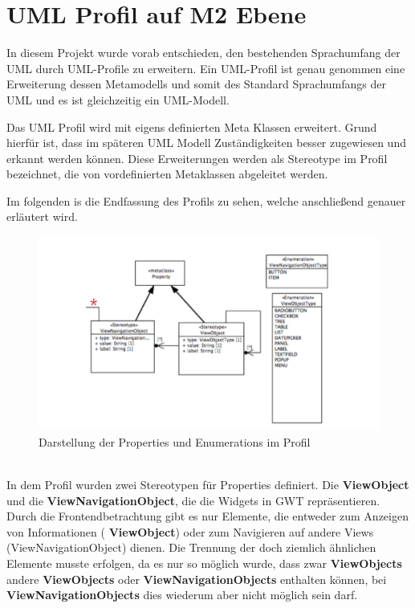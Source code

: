 \chapter{UML Profil auf M2 Ebene}
\label{UMLProfil}
In diesem Projekt wurde vorab entschieden, den bestehenden Sprachumfang der UML durch UML-Profile zu erweitern. Ein UML-Profil ist genau genommen eine Erweiterung dessen Metamodells und somit des Standard Sprachumfangs der UML und es ist gleichzeitig ein UML-Modell.

Das UML Profil wird mit eigens definierten Meta Klassen erweitert. Grund hierfür ist, dass im späteren UML Modell Zuständigkeiten besser zugewiesen und erkannt werden können.
Diese Erweiterungen werden als Stereotype im Profil bezeichnet, die von vordefinierten Metaklassen abgeleitet werden.

Im folgenden is die Endfassung des Profils zu sehen, welche anschließend genauer erläutert wird.
\begin{figure}[htbp]
\begin{center}
\includegraphics[width=\textwidth]{./img/ProfilProp.pdf}
\caption{Darstellung der Properties und Enumerations im Profil}\label{Fig:UMLProfil}
\end{center}
\end{figure}\\
In dem Profil wurden zwei Stereotypen für Properties definiert. Die \textbf{ViewObject} und die \textbf{ViewNavigationObject}, die die Widgets in GWT repräsentieren. Durch die Frontendbetrachtung gibt es nur Elemente, die entweder zum Anzeigen von Informationen ( \textbf{ViewObject}) oder zum Navigieren auf andere Views (ViewNavigationObject) dienen. Die Trennung der doch ziemlich ähnlichen Elemente musste erfolgen, da es nur so möglich wurde, dass zwar  \textbf{ViewObjects} andere  \textbf{ViewObjects} oder  \textbf{ViewNavigationObjects} enthalten können, bei  \textbf{ViewNavigationObjects} dies wiederum aber nicht möglich sein darf. 
